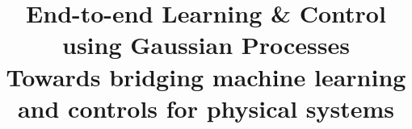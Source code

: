 \documentclass{sig-alternate-ipsn13}
\begin{document}
\title{End-to-end Learning \& Control using Gaussian Processes \\
	\vspace{0.1cm}
\Large \textbf{Towards bridging machine learning and controls for physical systems}}
%
%
%
%
%
\end{document}

